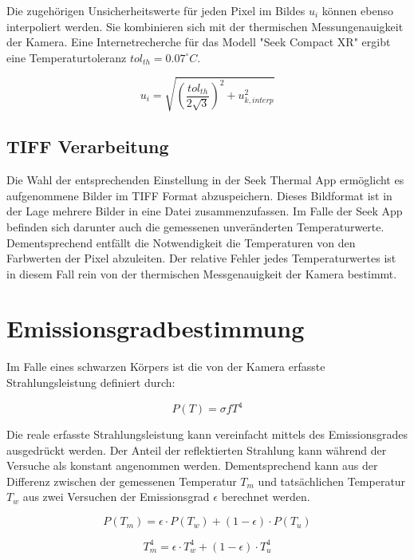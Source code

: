 \documentclass[10pt,a4paper,german]{article}
\begin{document}
Die zugehörigen Unsicherheitswerte für jeden Pixel im Bildes $u_i$ können ebenso interpoliert werden.
Sie kombinieren sich mit der thermischen Messungenauigkeit der Kamera.
Eine Internetrecherche für das Modell "Seek Compact XR" ergibt eine Temperaturtoleranz $tol_{th} = 0.07 ^{\circ}C$.

\begin{equation}
   u_i = \sqrt{ \left( \frac{tol_{th}}{2 \sqrt{3}} \right)^2 + u_{k,interp}^2 } 
\end{equation}

\subsection{TIFF Verarbeitung}
Die Wahl der entsprechenden Einstellung in der Seek Thermal App ermöglicht es aufgenommene Bilder im TIFF Format abzuspeichern. 
Dieses Bildformat ist in der Lage mehrere Bilder in eine Datei zusammenzufassen.
Im Falle der Seek App befinden sich darunter auch die gemessenen unveränderten Temperaturwerte.
Dementsprechend entfällt die Notwendigkeit die Temperaturen von den Farbwerten der Pixel abzuleiten.
Der relative Fehler jedes Temperaturwertes ist in diesem Fall rein von der thermischen Messgenauigkeit der Kamera bestimmt.

\section{Emissionsgradbestimmung}
Im Falle eines schwarzen Körpers ist die von der Kamera erfasste Strahlungsleistung definiert durch:

\begin{equation}
    P(T) = \sigma f T^4
\end{equation}

Die reale erfasste Strahlungsleistung kann vereinfacht mittels des Emissionsgrades ausgedrückt werden. 
Der Anteil der reflektierten Strahlung kann während der Versuche als konstant angenommen werden.
Dementsprechend kann aus der Differenz zwischen der gemessenen Temperatur $T_m$ und tatsächlichen Temperatur $T_w$ aus zwei Versuchen der Emissionsgrad $\epsilon$ berechnet werden.

\begin{equation}
    P(T_m) = \epsilon \cdot P(T_w) + (1 - \epsilon) \cdot P(T_u)
\end{equation}
 
\begin{equation}
   T_m^4 = \epsilon \cdot T_w^4 + (1 - \epsilon) \cdot T_u^4
\end{equation}
\end{document}
